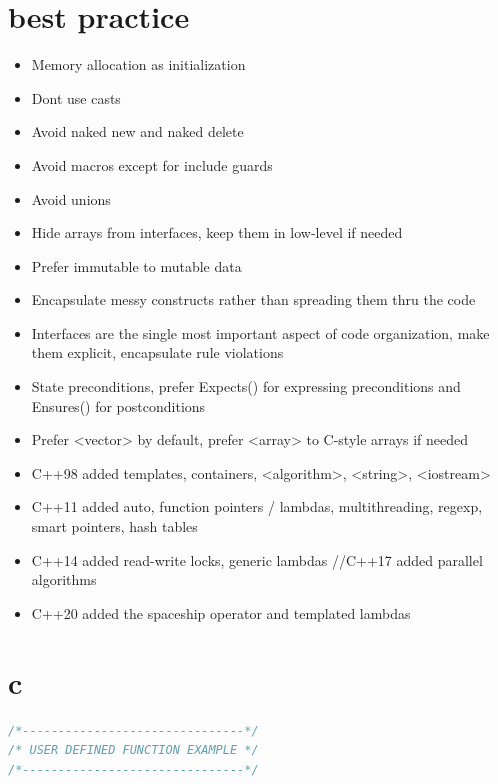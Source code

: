 \documentclass[8pt]{extarticle}
\begin{document}
\begin{small}
\begin{multicols}{2}
\section*{best practice}
\begin{itemize}
\item Memory allocation as initialization
\item Dont use casts
\item Avoid naked new and naked delete
\item Avoid macros except for include guards
\item Avoid unions
\item Hide arrays from interfaces, keep them in low-level if needed
\item Prefer immutable to mutable data
\item Encapsulate messy constructs rather than spreading them thru the code
\item Interfaces are the single most important aspect of code organization, make them explicit, encapsulate rule violations
\item State preconditions, prefer Expects() for expressing preconditions and Ensures() for postconditions
\item Prefer <vector> by default, prefer <array> to C-style arrays if needed
\item C++98 added templates, containers, <algorithm>, <string>, <iostream>
\item C++11 added auto, function pointers / lambdas, multithreading, regexp, smart pointers, hash tables
\item C++14 added read-write locks, generic lambdas //C++17 added parallel algorithms
\item C++20 added the spaceship operator and templated lambdas	
\end{itemize}

	


\section{c}




\begin{lstlisting}[language=C]
/*-------------------------------*/
/* USER DEFINED FUNCTION EXAMPLE */
/*-------------------------------*/


\end{lstlisting}
\end{multicols}
\end{small}
\end{document}
